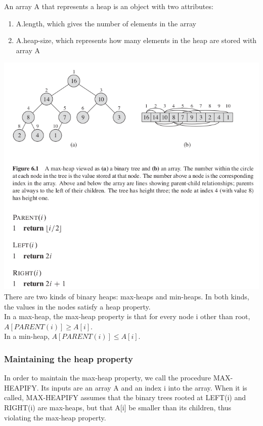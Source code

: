 \documentclass[11pt]{article}
\begin{document}
An array A that represents a heap is an object with two attributes: \\
\begin{enumerate}
\item A.length, which gives the number of elements in the array \\
\item A.heap-size, which represents how many elements in the heap are stored with array A \\
\end{enumerate}

\includegraphics[width=.9\linewidth]{pics/c6_heap.png} \\

There are two kinds of binary heaps: max-heaps and min-heaps. In both kinds, the values in the nodes satisfy a heap property. \\

In a max-heap, the max-heap property is that for every node i other than root, $A[PARENT(i)] \ge A[i]$. \\
In a min-heap, $A[PARENT(i)] \le A[i]$. \\

\subsubsection{Maintaining the heap property}
\label{sec-3-1-2}
In order to maintain the max-heap property, we call the procedure MAX-HEAPIFY. Its inputs are an array A and an index i into the array. When it is called, MAX-HEAPIFY assumes that the binary trees rooted at LEFT(i) and RIGHT(i) are max-heaps, but that A[i] be smaller than its children, thus violating the max-heap property. \\
\end{document}
